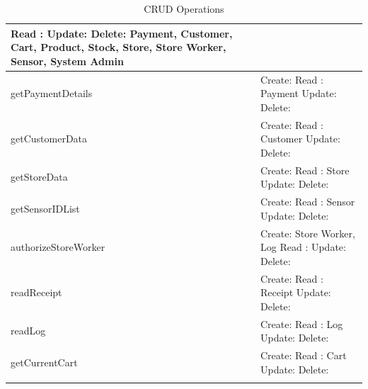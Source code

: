 \documentclass[11pt]{article}
\begin{document}
\begin{longtable}[H]{|p{5cm}|p{9cm}|}
          Read  : \newline
          Update: \newline
          Delete: Payment, Customer, Cart, Product, Stock, Store, Store Worker, Sensor, System Admin \\ \hline
        getPaymentDetails & 
          Create: \newline
          Read  : Payment \newline
          Update: \newline
          Delete: \\ \hline
        getCustomerData & 
          Create: \newline
          Read  : Customer \newline
          Update: \newline
          Delete: \\ \hline
        getStoreData & 
          Create: \newline
          Read  : Store \newline
          Update: \newline
          Delete: \\ \hline
        getSensorIDList & 
          Create: \newline
          Read  : Sensor \newline
          Update: \newline
          Delete: \\ \hline
        authorizeStoreWorker & 
          Create: Store Worker, Log \newline
          Read  : \newline
          Update: \newline
          Delete: \\ \hline
        readReceipt & 
          Create: \newline
          Read  : Receipt \newline
          Update: \newline
          Delete: \\ \hline
        readLog & 
          Create: \newline
          Read  : Log \newline
          Update: \newline
          Delete: \\ \hline
        getCurrentCart & 
          Create: \newline
          Read  : Cart \newline
          Update: \newline
          Delete: \\ \hline
        
    \caption{CRUD Operations}
    \label{CRUD}
    \end{longtable}       
\end{document}
